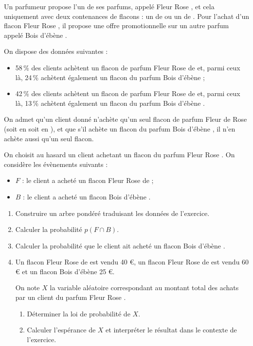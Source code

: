 \medskip

Un parfumeur propose l'un de ses parfums, appelé \og Fleur Rose \fg, et cela uniquement avec
deux contenances de flacons : un de   ou un de . Pour l'achat d'un flacon \og Fleur Rose \fg, il propose une offre promotionnelle sur un autre parfum appelé \og Bois d'ébène \fg.

On dispose des données suivantes :

\begin{itemize}
\item 58\,\% des clients achètent un flacon de parfum \og Fleur Rose \fg{} de  et, parmi ceux là, 24\,\% achètent également un flacon du parfum \og Bois d'ébène \fg ;
\item 42\,\% des clients achètent un flacon de parfum \og Fleur Rose \fg{} de   et, parmi ceux là,
13\,\% achètent également un flacon du parfum \og Bois d'ébène \fg.
\end{itemize}

On admet qu'un client donné n'achète qu'un seul flacon de parfum \og Fleur de Rose \fg{} (soit en
 soit en ), et que s'il achète un flacon du parfum \og Bois d'ébène \fg, il n'en achète
aussi qu'un seul flacon.

On choisit au hasard un client achetant un flacon du parfum \og Fleur Rose \fg. On considère les
évènements suivants :
\begin{itemize}
\item $F$ : \og le client a acheté un flacon \og Fleur Rose \fg{} de  \fg ;
\item $B$ : \og le client a acheté un flacon \og Bois d'ébène \fg.
\end{itemize}

\medskip

\begin{enumerate}
\item Construire un arbre pondéré traduisant les données de l'exercice.
\item Calculer la probabilité $p(F \cap B)$.
\item Calculer la probabilité que le client ait acheté un flacon \og Bois d'ébène \fg.
\item Un flacon \og Fleur Rose \fg{} de  est vendu 40 \euro, un flacon \og Fleur Rose \fg{} de  est vendu 60 \euro{} et un flacon \og Bois d'ébène \fg{} 25 \euro.

On note $X$ la variable aléatoire correspondant
au montant total des achats par un client du parfum \og Fleur Rose \fg.
	\begin{enumerate}
		\item  Déterminer la loi de probabilité de $X$.
		\item Calculer l'espérance de $X$ et interpréter le résultat dans le contexte de l'exercice.
	\end{enumerate}
\end{enumerate}

\vspace{0,5cm}
